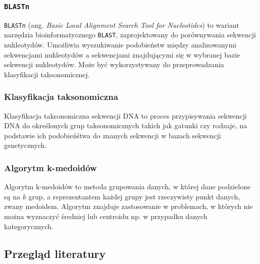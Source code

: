         \subsubsection{\texttt{BLASTn}}

            \texttt{BLASTn} (ang. \textit{Basic Local Alignment Search Tool for Nucleotides}) to wariant narzędzia bioinformatycznego \texttt{BLAST}, zaprojektowany do porównywania sekwencji nukleotydów. Umożliwia wyszukiwanie podobieństw między analizowanymi sekwencjami nukleotydów a sekwencjami znajdującymi się w wybranej bazie sekwencji nukleotydów. Może być wykorzystywany do przeprowadzania klasyfikacji taksonomicznej.

        \subsubsection{Klasyfikacja taksonomiczna}

            Klasyfikacja taksonomiczna sekwencji DNA to proces przypisywania sekwencji DNA do określonych grup taksonomicznych takich jak gatunki czy rodzaje, na podstawie ich podobieńśtwa do znanych sekwencji w bazach sekwencji genetycznych.

        \subsubsection{Algorytm k-medoidów}

            Algorytm k-medoidów to metoda grupowania danych, w której dane podzielone są na $k$ grup, a reprezentantem każdej grupy jest rzeczywisty punkt danych, zwany medoidem. Algorytm znajduje zastosowanie w problemach, w których nie można wyznaczyć średniej lub centroidu np. w przypadku danych kategorycznych.

    \subsection{Przegląd literatury}



